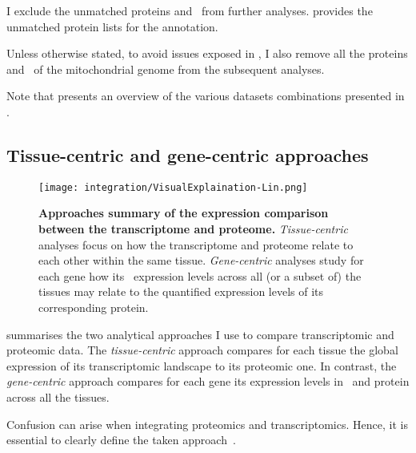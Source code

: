 I exclude the unmatched proteins and \mRNAs\ from further analyses.
 provides the unmatched protein lists
for the  annotation.\mybr\

Unless otherwise stated, to avoid issues exposed in ,
I also remove all the proteins and \mRNAs\ of the mitochondrial genome
from the subsequent analyses.

Note that  presents
an overview of the various datasets combinations presented
in .

\subsection{Tissue-centric and gene-centric approaches}

\begin{figure}[!ht]
    \texttt{[image: integration/VisualExplaination-Lin.png]}\centering
    \caption[Summary of the expression comparison approaches between
    the transcriptome and proteome]{\label{fig:visualexp}\textbf{Approaches
    summary of the expression comparison between the transcriptome and proteome.}
    \emph{Tissue-centric} analyses focus on
    how the transcriptome and proteome relate to each other within the same tissue.
    \emph{Gene-centric} analyses study for each gene how its \mRNA\ expression
    levels across all (or a subset of) the tissues may relate to
    the quantified expression levels of its corresponding protein.
    }
\end{figure}

 summarises the two analytical approaches I use
to compare transcriptomic and proteomic data.
The \emph{tissue-centric} approach compares for each tissue
the global expression of its transcriptomic landscape to its proteomic one.
In contrast,
the \emph{gene-centric} approach compares for each gene
its expression levels in \mRNA\ and protein across all the tissues.

Confusion can arise
when integrating proteomics and transcriptomics.
Hence, it is essential
to clearly define the taken approach~.\mybr\
\vspace{-2mm}

